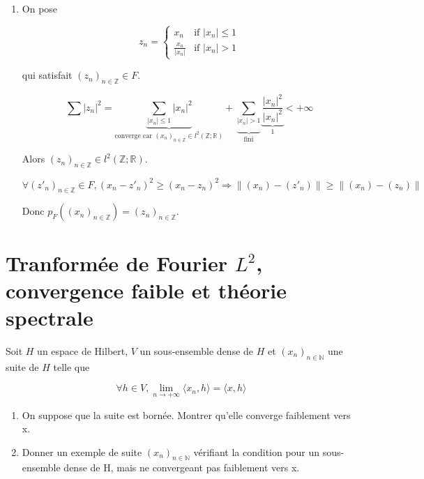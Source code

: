 \documentclass[10pt,a4paper,oneside]{article}
\newenvironment{exercice}[1][Exercice]{\begin{trivlist}
\item[\hskip \labelsep {\bfseries #1}]}{\end{trivlist}}
\newenvironment{solution}[1][Solution]{\begin{trivlist}
\item[\hskip \labelsep {\bfseries #1}]}{\end{trivlist}}
\begin{document}
\begin{exercice}
\begin{solution}
\begin{enumerate}
\item
On pose

\[
 z_n =
  \begin{cases}
   x_n & \text{if } |x_n| \leq 1 \\
   \frac{x_n}{|x_n|} & \text{if } |x_n| > 1
  \end{cases}
\]

qui satisfait $(z_n)_{n \in \mathbb{Z}} \in F$.

\[
\sum |z_n|^2 = \underbrace{\sum_{|x_n| \leq 1} |x_n|^2}_{\text{converge car } (x_n)_{n \in \mathbb{Z}} \in l^2(\mathbb{Z};\mathbb{R})} + \underbrace{ \sum_{|x_n| > 1} }_{ \text{fini} }  \underbrace{ \frac{|x_n|^2}{|x_n|^2} }_{1} < +\infty
\]

Alors $(z_n)_{n \in \mathbb{Z}} \in l^2(\mathbb{Z};\mathbb{R})$.

\[
\forall (z'_n)_{n \in \mathbb{Z}} \in F, (x_n - z'_n)^2 \geq (x_n - z_n)^2 \Rightarrow \| (x_n) - (z'_n) \| \geq \| (x_n) - (z_n) \|
\]

Donc $p_{F}((x_n)_{n \in \mathbb{Z}}) = (z_n)_{n \in \mathbb{Z}}$.

\end{enumerate}

\end{solution}

\end{exercice}

\section{Tranformée de Fourier $L^2$, convergence faible et théorie spectrale}

\begin{exercice}

Soit $H$ un espace de Hilbert, $V$ un sous-ensemble dense de $H$ et $(x_n)_{n \in \mathbb{N}}$ une suite de $H$ telle que 

\[
\forall h \in V, \lim\limits_{n \rightarrow +\infty} \langle x_n,h \rangle = \langle x,h \rangle
\]

\begin{enumerate}

\item
On suppose que la suite est bornée. Montrer qu'elle converge faiblement vers x.

\item
Donner un exemple de suite $(x_n)_{n \in \mathbb{N}}$ vérifiant la condition pour un sous-ensemble dense de H, mais ne convergeant pas faiblement vers x.

\end{enumerate}

\end{exercice}
\end{document}
